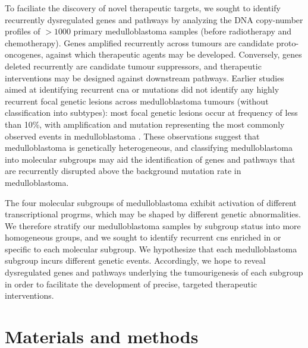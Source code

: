 
To faciliate the discovery of novel therapeutic targets, we sought to identify recurrently dysregulated genes and pathways by analyzing the DNA copy-number profiles of $> 1000$ primary medulloblastoma samples (before radiotherapy and chemotherapy). Genes amplified recurrently across tumours are candidate proto-oncogenes, against which therapeutic agents may be developed. Conversely, genes deleted recurrently are candidate tumour suppressors, and therapeutic interventions may be designed against downstream pathways. Earlier studies aimed at identifying recurrent \gls{cna} or mutations did not identify any highly recurrent focal genetic lesions across medulloblastoma tumours (without classification into subtypes): most focal genetic lesions occur at frequency of less than 10\%, with  amplification and  mutation representing the most commonly observed events in medulloblastoma . These observations suggest that medulloblastoma is genetically heterogeneous, and classifying medulloblastoma into molecular subgroups may aid the identification of genes and pathways that are recurrently disrupted above the background mutation rate in medulloblastoma.

The four molecular subgroups of medulloblastoma exhibit activation of different transcriptional progrms, which may be shaped by different genetic abnormalities. We therefore stratify our medulloblastoma samples by subgroup status into more homogeneous groups, and we sought to identify recurrent \gls{cns} enriched in or specific to each molecular subgroup. We hypothesize that each medulloblastoma subgroup incurs different genetic events. Accordingly, we hope to reveal dysregulated genes and pathways underlying the tumourigenesis of each subgroup in order to facilitate the development of precise, targeted therapeutic interventions.


\clearpage

\section{Materials and methods}

